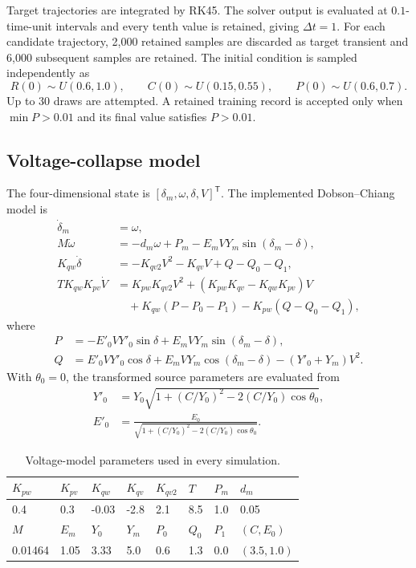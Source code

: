 \documentclass[10pt,a4paper]{article}
\begin{document}
Target trajectories are integrated by RK45. The solver output is evaluated at
$0.1$-time-unit intervals and every tenth value is retained, giving
$\Delta t=1$. For each candidate trajectory, 2,000 retained samples are
discarded as target transient and 6,000 subsequent samples are retained. The
initial condition is sampled independently as
\begin{equation}
  R(0)\sim U(0.6,1.0),\qquad
  C(0)\sim U(0.15,0.55),\qquad
  P(0)\sim U(0.6,0.7).
\end{equation}
Up to 30 draws are attempted. A retained training record is accepted only when
$\min P>0.01$ and its final value satisfies $P>0.01$.

\subsection{Voltage-collapse model}

The four-dimensional state is
$[\delta_m,\omega,\delta,V]^{\mathsf T}$. The implemented Dobson--Chiang model
is~\cite{Dobson1989,Kong2021}
\begin{align}
  \dot{\delta}_m &= \omega,\\
  M\dot{\omega} &= -d_m\omega+P_m-E_m VY_m\sin(\delta_m-\delta),\\
  K_{qw}\dot{\delta} &= -K_{qv2}V^2-K_{qv}V+Q-Q_0-Q_1,\\
  TK_{qw}K_{pv}\dot V
  &=K_{pw}K_{qv2}V^2+(K_{pw}K_{qv}-K_{qw}K_{pv})V\nonumber\\
  &\quad+K_{qw}(P-P_0-P_1)-K_{pw}(Q-Q_0-Q_1),
  \label{eq:voltage}
\end{align}
where
\begin{align}
  P&=-E'_0 VY'_0\sin\delta+E_mVY_m\sin(\delta_m-\delta),\\
  Q&= E'_0 VY'_0\cos\delta+E_mVY_m\cos(\delta_m-\delta)
  -(Y'_0+Y_m)V^2.
  \label{eq:pq}
\end{align}
With $\theta_0=0$, the transformed source parameters are evaluated from
\begin{align}
  Y'_0&=Y_0\sqrt{1+(C/Y_0)^2-2(C/Y_0)\cos\theta_0},\\
  E'_0&=\frac{E_0}{\sqrt{1+(C/Y_0)^2-2(C/Y_0)\cos\theta_0}}.
\end{align}

\begin{table}[ht]
\centering
\caption{Voltage-model parameters used in every simulation.}
\label{tab:voltage-parameters}
\small
\begin{tabular}{@{}llllllll@{}}
\toprule
$K_{pw}$ & $K_{pv}$ & $K_{qw}$ & $K_{qv}$ & $K_{qv2}$ & $T$ & $P_m$ & $d_m$ \\
\midrule
0.4 & 0.3 & -0.03 & -2.8 & 2.1 & 8.5 & 1.0 & 0.05 \\
\addlinespace
$M$ & $E_m$ & $Y_0$ & $Y_m$ & $P_0$ & $Q_0$ & $P_1$ & $(C,E_0)$ \\
\midrule
0.01464 & 1.05 & 3.33 & 5.0 & 0.6 & 1.3 & 0.0 & $(3.5,1.0)$ \\
\bottomrule
\end{tabular}
\end{table}
\end{document}
